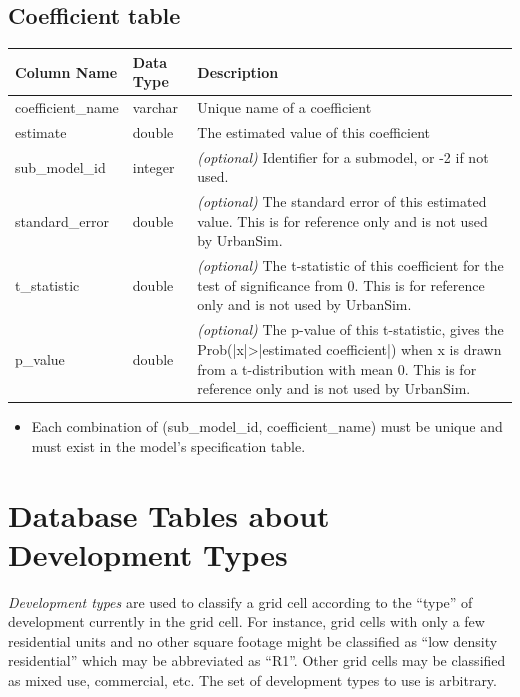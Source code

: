 \subsection{Coefficient table}

\begin{tabular}{|l|l|p{4.5in}|}

\hline
\textbf{Column Name} & \textbf{Data Type} & \textbf{Description} \\

\hline
coefficient_name & varchar & Unique name of a coefficient  \\

\hline
estimate & double & The estimated value of this coefficient \\

\hline
sub_model_id & integer &  \emph{(optional)} Identifier for a submodel, or
-2 if not used. \\

\hline
standard_error & double & \emph{(optional) }
The standard error of this estimated value. This is for reference only and is
not used by UrbanSim.  \\

\hline
t_statistic & double & \emph{(optional) }
The t-statistic of this coefficient for the test of significance from 0. This
is for reference only and is not used by UrbanSim.  \\

\hline p_value & double & \emph{(optional) } The p-value of this t-statistic,
gives the Prob(|x|\textgreater{}|estimated coefficient|) when x is drawn from a
t-distribution with mean 0. This is for reference only and is not used by
UrbanSim.   \\

\hline

\end{tabular}

\begin{itemize} \tight
\item Each combination of (sub_model_id, coefficient_name) must be unique and must exist in the model's specification table.
\end{itemize}

\section{Database Tables about Development Types}
\label{sec:development-tables}

\emph{Development types} are used to classify a grid cell according to the
``type'' of development currently in the grid cell.  For instance, grid cells
with only a few residential units and no other square footage might be
classified as ``low density residential'' which may be abbreviated as ``R1''.
Other grid cells may be classified as mixed use, commercial, etc.  The set of
development types to use is arbitrary.

